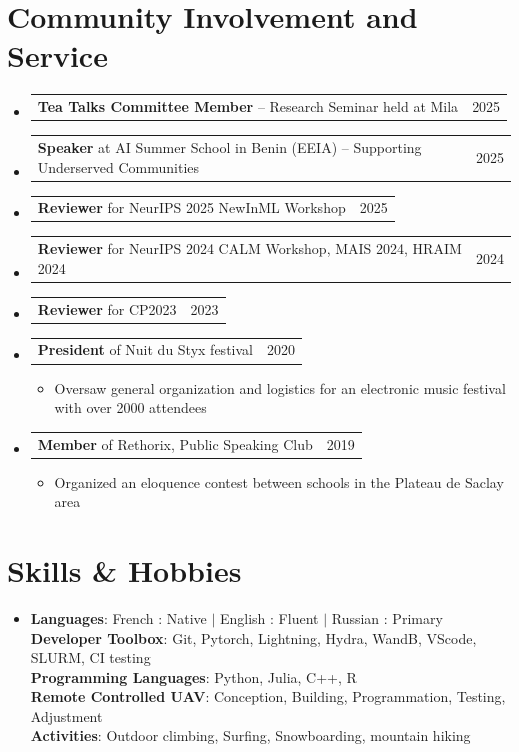 \documentclass[letterpaper,11pt]{article}
\makeatletter
\newcommand{\resumeItem}[1]{
  \item\small{
    {#1 \vspace{-2pt}}
  }
}
\newcommand{\resumeProjectHeading}[2]{
    \item
    \begin{tabular*}{0.97\textwidth}{l@{\extracolsep{\fill}}r}
      \small#1 & #2 \\
    \end{tabular*}\vspace{-7pt}
}
\newcommand{\resumeSubHeadingListStart}{\begin{itemize}[leftmargin=0.15in, label={}]}
\newcommand{\resumeSubHeadingListEnd}{\end{itemize}}
\newcommand{\resumeItemListStart}{\begin{itemize}}
\newcommand{\resumeItemListEnd}{\end{itemize}\vspace{-5pt}}
\makeatother
\begin{document}
\section{Community Involvement and Service}
\resumeSubHeadingListStart
  \resumeProjectHeading
    {\textbf{Tea Talks Committee Member }– Research Seminar held at Mila}{2025}
  \resumeProjectHeading
    {\textbf{Speaker} at AI Summer School in Benin (EEIA) – Supporting Underserved Communities}{2025}
  \resumeProjectHeading
    {\textbf{Reviewer} for NeurIPS 2025 NewInML Workshop}{2025}
  \resumeProjectHeading
    {\textbf{Reviewer} for NeurIPS 2024 CALM Workshop, MAIS 2024, HRAIM 2024}{2024}
  \resumeProjectHeading
    {\textbf{Reviewer} for CP2023}{2023}
  \resumeProjectHeading
    {\textbf{President} of Nuit du Styx festival}{2020}
    \resumeItemListStart
      \resumeItem{Oversaw general organization and logistics for an electronic music festival with over 2000 attendees}
    \resumeItemListEnd
  \resumeProjectHeading
    {\textbf{Member} of Rethorix, Public Speaking Club }{2019}
    \resumeItemListStart
      \resumeItem{Organized an eloquence contest between schools in the Plateau de Saclay area}
    \resumeItemListEnd

\resumeSubHeadingListEnd
\section{Skills \& Hobbies}
 \begin{itemize}[leftmargin=0.15in, label={}]
    \item{
    \textbf{Languages}{: French : Native $|$ English : Fluent $|$ Russian : Primary }} \\
     \textbf{Developer Toolbox}{: Git, Pytorch, Lightning, Hydra, WandB, VScode, SLURM, CI testing} \\
     \textbf{Programming Languages}{: Python, Julia, C++, R} \\
    \vspace{10pt}
    \textbf{Remote Controlled UAV}{: Conception, Building, Programmation, Testing, Adjustment } \\
     \textbf{Activities}{: Outdoor climbing, Surfing, Snowboarding, mountain hiking }
 \end{itemize}
\end{document}
